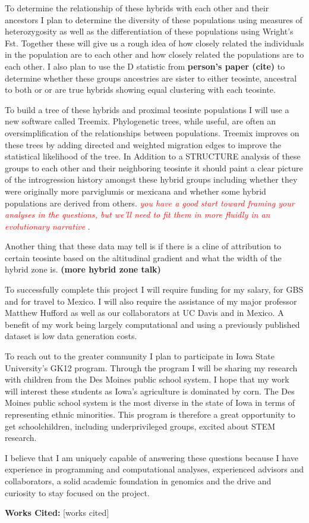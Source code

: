 \documentclass[12pt]{amsart}
\newcommand{\mbh}[1]{\textcolor{red}{ \emph{\scriptsize  #1}} }
\begin{document}
To determine the relationship of these hybrids with each other and their ancestors I plan to determine the diversity of these populations using measures of heterozygosity as well as the differentiation of these populations using Wright's Fst.  
Together these will give us a rough idea of how closely related the individuals in the population are to each other and how closely related the populations are to each other.
I also plan to use the D statistic from \textbf{person's paper (cite)} to determine whether these groups ancestries are sister to either teosinte, ancestral to both or or are true hybrids showing equal clustering with each teosinte.

To build a tree of these hybrids and proximal teosinte populations I will use a new software called Treemix.
Phylogenetic trees, while useful, are often an oversimplification of the relationships between populations.%
Treemix improves on these trees by adding directed and weighted migration edges to improve the statistical likelihood of the tree.
In Addition to a STRUCTURE analysis of these groups to each other and their neighboring teosinte it should paint a clear picture of the introgression history amongst these hybrid groups including whether they were originally more parviglumis or mexicana and whether some hybrid populations are derived from others.
\mbh{you have a good start toward framing your analyses in the questions, but we'll need to fit them in more fluidly in an evolutionary narrative}.

Another thing that these data may tell is if there is a cline of attribution to certain teosinte based on the altitudinal gradient and what the width of the hybrid zone is. \textbf{(more hybrid zone talk)}

To successfully complete this project I will require funding for my salary, for GBS and for travel to Mexico.  I will also require the assistance of my major professor Matthew Hufford as well as our collaborators at UC Davis and in Mexico.
A benefit of my work being largely computational and using a previously published dataset is low data generation costs.

To reach out to the greater community I plan to participate in Iowa State University's GK12 program.  Through the program I will be sharing my research with children from the Des Moines public school system.  
I hope that my work will interest these students as Iowa's agriculture is dominated by corn.
The Des Moines public school system is the most diverse in the state of Iowa in terms of representing ethnic minorities.  This program is therefore a great opportunity to get schoolchildren, including underprivileged groups, excited about STEM research.  

I believe that I am uniquely capable of answering these questions because I have experience in programming and computational analyses, experienced advisors and collaborators, a solid academic foundation in genomics and the drive and curiosity to stay focused on the project.

\textbf{Works Cited:}
\small
[works cited]
\end{document}
